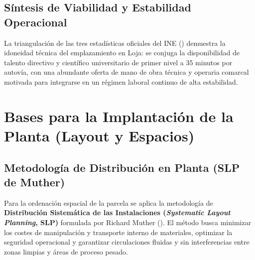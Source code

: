 \documentclass{report}
\begin{document}
\section{Síntesis de Viabilidad y Estabilidad Operacional}
La triangulación de las tres estadísticas oficiales del INE (\autocite{INE_Formacion2025, INE_EPA2026}) demuestra la idoneidad técnica del emplazamiento en Loja: se conjuga la disponibilidad de talento directivo y científico universitario de primer nivel a \num{35} minutos por autovía, con una abundante oferta de mano de obra técnica y operaria comarcal motivada para integrarse en un régimen laboral continuo de alta estabilidad.

\chapter{Bases para la Implantación de la Planta (Layout y Espacios)}

\section{Metodología de Distribución en Planta (SLP de Muther)}
Para la ordenación espacial de la parcela se aplica la metodología de \textbf{Distribución Sistemática de las Instalaciones (\textit{Systematic Layout Planning}, SLP)} formulada por Richard Muther (\textcite{MeyersStephens2005}). El método busca minimizar los costes de manipulación y transporte interno de materiales, optimizar la seguridad operacional y garantizar circulaciones fluidas y sin interferencias entre zonas limpias y áreas de proceso pesado.
\end{document}
